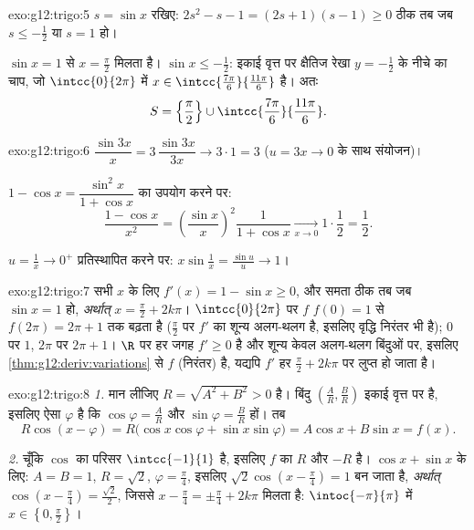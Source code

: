 \begin{solution}{exo:g12:trigo:5}
$s = \sin x$ रखिए: $2s^2 - s - 1 = (2s + 1)(s - 1) \geq 0$ ठीक तब जब $s \leq -\frac12$ या $s = 1$ हो।

$\sin x = 1$ से $x = \frac\pi2$ मिलता है। $\sin x \leq -\frac12$: इकाई वृत्त पर क्षैतिज रेखा $y = -\frac12$ के नीचे का चाप,
जो $\intcc{0}{2\pi}$ में $x \in \intcc{\frac{7\pi}{6}}{\frac{11\pi}{6}}$ है। अतः
\[
S = \left\{\frac{\pi}{2}\right\} \cup
\intcc{\frac{7\pi}{6}}{\frac{11\pi}{6}} .
\]
\end{solution}

\begin{solution}{exo:g12:trigo:6}
$\dfrac{\sin 3x}{x} = 3\,\dfrac{\sin 3x}{3x} \to 3 \cdot 1 = 3$ ($u = 3x \to 0$ के साथ संयोजन)।

$1 - \cos x = \dfrac{\sin^2 x}{1 + \cos x}$ का उपयोग करने पर:
\[
\frac{1 - \cos x}{x^2}
= \left(\frac{\sin x}{x}\right)^{\!2} \frac{1}{1 + \cos x}
\xrightarrow[x\to0]{} 1 \cdot \frac12 = \frac12 .
\]

$u = \frac1x \to 0^+$ प्रतिस्थापित करने पर: $x \sin\frac1x = \frac{\sin u}{u} \to 1$।
\end{solution}

\begin{solution}{exo:g12:trigo:7}
सभी $x$ के लिए $f'(x) = 1 - \sin x \geq 0$, और समता ठीक तब जब $\sin x = 1$ हो, \emph{अर्थात्} $x = \frac\pi2 + 2k\pi$। $\intcc{0}{2\pi}$
पर $f$ $f(0) = 1$ से $f(2\pi) = 2\pi + 1$ तक बढ़ता है ($\frac{\pi}{2}$ पर $f'$ का शून्य अलग-थलग है, इसलिए
वृद्धि निरंतर भी है);  $0$ पर $1$,  $2\pi$ पर $2\pi + 1$। $\R$ पर हर
जगह $f' \geq 0$ है और शून्य केवल अलग-थलग बिंदुओं पर, इसलिए \cref{thm:g12:deriv:variations} से $f$ (निरंतर)
 है, यद्यपि $f'$ हर $\frac\pi2 + 2k\pi$ पर लुप्त हो जाता है।
\end{solution}

\begin{solution}{exo:g12:trigo:8}
\emph{1.} मान लीजिए $R = \sqrt{A^2 + B^2} > 0$ है। बिंदु $\left(\frac AR, \frac BR\right)$ इकाई वृत्त पर है, इसलिए ऐसा $\varphi$ है
कि $\cos\varphi = \frac AR$ और $\sin\varphi = \frac BR$ हों। तब
\[
R\cos(x - \varphi) = R\bigl(\cos x\cos\varphi + \sin x \sin\varphi\bigr)
= A\cos x + B\sin x = f(x).
\]

\emph{2.} चूँकि $\cos$ का परिसर $\intcc{-1}{1}$ है, इसलिए $f$ का  $R$ और 
$-R$ है। $\cos x + \sin x$ के लिए: $A = B = 1$, $R = \sqrt2$, $\varphi = \frac\pi4$, इसलिए  $\sqrt2\cos\left(x - \frac\pi4\right) = 1$ बन जाता है,
\emph{अर्थात्} $\cos\left(x - \frac\pi4\right) = \frac{\sqrt2}{2}$, जिससे $x - \frac\pi4 = \pm\frac\pi4 + 2k\pi$ मिलता है: $\intoc{-\pi}{\pi}$ में $x \in \left\{0, \frac\pi2\right\}$।
\end{solution}

